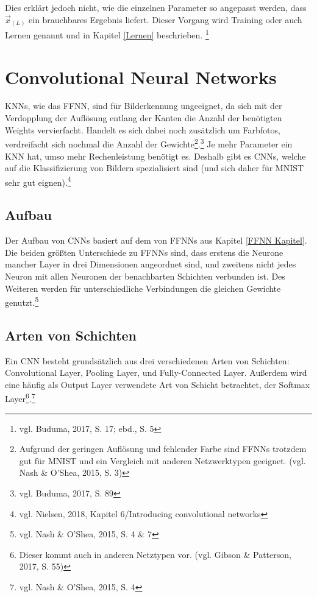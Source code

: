 \documentclass[
	a4paper,
	12pt,
	ngerman,
	oneside
]{scrreprt}											%
\newcommand{\practitioner}[1]{vgl. Gibson \& Patterson, 2017, S. {#1}}
\newcommand{\fundamentals}[1]{vgl. Buduma, 2017, S. {#1}}
\newcommand{\cnnKlein}[1]{vgl. Nash \& O'Shea, 2015, S. {#1}}
\begin{document}
			Dies erklärt jedoch nicht, wie die einzelnen Parameter so angepasst werden, dass $\vec{x}_{(L)}$ ein brauchbares Ergebnis liefert. Dieser Vorgang wird Training oder auch Lernen genannt und in Kapitel \ref{Lernen} beschrieben. \footnote{\fundamentals{17; ebd., S. 5}}


	
	\chapter{Convolutional Neural Networks}\label{CNN Kapitel}
		KNNs, wie das FFNN, sind für Bilderkennung ungeeignet, da sich mit der Verdopplung der Auflösung entlang der Kanten die Anzahl der benötigten Weights vervierfacht. Handelt es sich dabei noch zusätzlich um Farbfotos, verdreifacht sich nochmal die Anzahl der Gewichte\footnote{Aufgrund der geringen Auflösung und fehlender Farbe sind FFNNs trotzdem gut für MNIST und ein Vergleich mit anderen Netzwerktypen geeignet. (\cnnKlein{3})}.\footnote{\fundamentals{89}} Je mehr Parameter ein KNN hat, umso mehr Rechenleistung benötigt es. Deshalb gibt es CNNs, welche auf die Klassifizierung von Bildern spezialisiert sind (und sich daher für MNIST sehr gut eignen).\footnote{vgl. Nielsen, 2018, Kapitel 6/Introducing convolutional networks}
	
		
		\section{Aufbau}
			Der Aufbau von CNNs basiert auf dem von FFNNs aus Kapitel \ref{FFNN Kapitel}. Die beiden größten Unterschiede zu FFNNs sind, dass erstens die Neurone mancher Layer in drei Dimensionen angeordnet sind, und zweitens nicht jedes Neuron mit allen Neuronen der benachbarten Schichten verbunden ist. Des Weiteren werden für unterschiedliche Verbindungen die gleichen Gewichte genutzt.\footnote{\cnnKlein{4 \& 7}}
		
			
		\section{Arten von Schichten}
			Ein CNN besteht grundsätzlich aus drei verschiedenen Arten von Schichten: Convolutional Layer, Pooling Layer, und Fully-Connected Layer. Außerdem wird eine häufig als Output Layer verwendete Art von Schicht betrachtet, der Softmax Layer\footnote{Dieser kommt auch in anderen Netztypen vor. (\practitioner{55})}.\footnote{\cnnKlein{4}}
		
\end{document}

